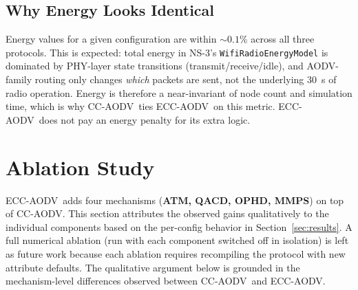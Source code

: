 \documentclass[11pt,a4paper]{article}
\newcommand{\ecc}{ECC-AODV}
\newcommand{\cca}{CC-AODV}
\begin{document}
\subsection{Why Energy Looks Identical}

Energy values for a given configuration are within $\sim 0.1\%$ across all
three protocols. This is expected: total energy in NS-3's
\texttt{WifiRadioEnergyModel} is dominated by PHY-layer state transitions
(transmit/receive/idle), and AODV-family routing only changes \emph{which}
packets are sent, not the underlying $30$~s of radio operation. Energy is
therefore a near-invariant of node count and simulation time, which is why
\cca\ ties \ecc\ on this metric. \ecc\ does not pay an energy penalty for its
extra logic.

\section{Ablation Study}
\label{sec:ablation}

\ecc\ adds four mechanisms (\textbf{ATM, QACD, OPHD, MMPS}) on top of \cca.
This section attributes the observed gains qualitatively to the individual
components based on the per-config behavior in Section~\ref{sec:results}.
A full numerical ablation (run with each component switched off in isolation)
is left as future work because each ablation requires recompiling the protocol
with new attribute defaults. The qualitative argument below is grounded in the
mechanism-level differences observed between \cca\ and \ecc.
\end{document}
